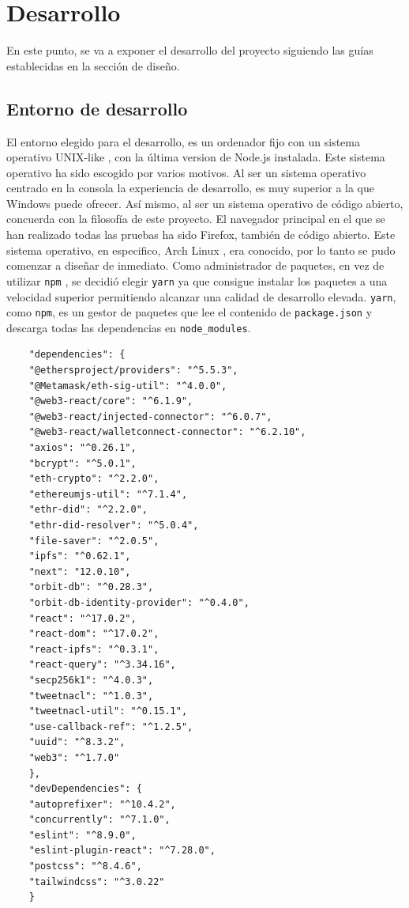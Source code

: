 \section{Desarrollo}
En este punto, se va a exponer el desarrollo del proyecto siguiendo las guías establecidas en la sección de diseño.
\subsection{Entorno de desarrollo}
El entorno elegido para el desarrollo, es un ordenador fijo con un sistema operativo UNIX-like \cite{web:unix-like}, con la última version de Node.js instalada. Este sistema operativo ha sido escogido por varios motivos. Al ser un sistema operativo centrado en la consola la experiencia de desarrollo, es muy superior a la que Windows puede ofrecer. Así mismo, al ser un sistema operativo de código abierto, concuerda con la filosofía de este proyecto.
El navegador principal en el que se han realizado todas las pruebas ha sido Firefox, también de código abierto.
Este sistema operativo, en especifico, Arch Linux \cite{web:arch}, era conocido, por lo tanto se pudo comenzar a diseñar de inmediato.
Como administrador de paquetes, en vez de utilizar \verb|npm| \cite{web:npm}, se decidió elegir \verb|yarn| \cite{web:yarn} ya que consigue instalar los paquetes a una velocidad superior permitiendo alcanzar una calidad de desarrollo elevada. \verb|yarn|, como \verb|npm|, es un gestor de paquetes que lee el contenido de \verb|package.json| y descarga todas las dependencias en \verb|node_modules|.
\begin{lstlisting}
    "dependencies": {
	"@ethersproject/providers": "^5.5.3",
    "@Metamask/eth-sig-util": "^4.0.0",
    "@web3-react/core": "^6.1.9",
    "@web3-react/injected-connector": "^6.0.7",
    "@web3-react/walletconnect-connector": "^6.2.10",
    "axios": "^0.26.1",
    "bcrypt": "^5.0.1",
    "eth-crypto": "^2.2.0",
    "ethereumjs-util": "^7.1.4",
    "ethr-did": "^2.2.0",
    "ethr-did-resolver": "^5.0.4",
    "file-saver": "^2.0.5",
    "ipfs": "^0.62.1",
    "next": "12.0.10",
    "orbit-db": "^0.28.3",
    "orbit-db-identity-provider": "^0.4.0",
    "react": "^17.0.2",
    "react-dom": "^17.0.2",
    "react-ipfs": "^0.3.1",
    "react-query": "^3.34.16",
    "secp256k1": "^4.0.3",
    "tweetnacl": "^1.0.3",
    "tweetnacl-util": "^0.15.1",
    "use-callback-ref": "^1.2.5",
    "uuid": "^8.3.2",
    "web3": "^1.7.0"
    },
    "devDependencies": {
    "autoprefixer": "^10.4.2",
    "concurrently": "^7.1.0",
    "eslint": "^8.9.0",
    "eslint-plugin-react": "^7.28.0",
    "postcss": "^8.4.6",
    "tailwindcss": "^3.0.22"
    }
\end{lstlisting}
